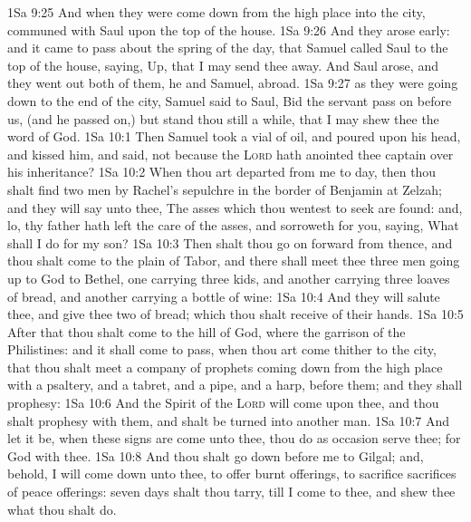 \vs 1Sa 9:25 And when they were come down from the high place into the city,  communed with Saul upon the top of the house.
\vs 1Sa 9:26 And they arose early: and it came to pass about the spring of the day, that Samuel called Saul to the top of the house, saying, Up, that I may send thee away. And Saul arose, and they went out both of them, he and Samuel, abroad.
\vs 1Sa 9:27  as they were going down to the end of the city, Samuel said to Saul, Bid the servant pass on before us, (and he passed on,) but stand thou still a while, that I may shew thee the word of God.
\vs 1Sa 10:1 Then Samuel took a vial of oil, and poured  upon his head, and kissed him, and said,  not because the \textsc{Lord} hath anointed thee  captain over his inheritance?
\vs 1Sa 10:2 When thou art departed from me to day, then thou shalt find two men by Rachel's sepulchre in the border of Benjamin at Zelzah; and they will say unto thee, The asses which thou wentest to seek are found: and, lo, thy father hath left the care of the asses, and sorroweth for you, saying, What shall I do for my son?
\vs 1Sa 10:3 Then shalt thou go on forward from thence, and thou shalt come to the plain of Tabor, and there shall meet thee three men going up to God to Bethel, one carrying three kids, and another carrying three loaves of bread, and another carrying a bottle of wine:
\vs 1Sa 10:4 And they will salute thee, and give thee two  of bread; which thou shalt receive of their hands.
\vs 1Sa 10:5 After that thou shalt come to the hill of God, where  the garrison of the Philistines: and it shall come to pass, when thou art come thither to the city, that thou shalt meet a company of prophets coming down from the high place with a psaltery, and a tabret, and a pipe, and a harp, before them; and they shall prophesy:
\vs 1Sa 10:6 And the Spirit of the \textsc{Lord} will come upon thee, and thou shalt prophesy with them, and shalt be turned into another man.
\vs 1Sa 10:7 And let it be, when these signs are come unto thee,  thou do as occasion serve thee; for God  with thee.
\vs 1Sa 10:8 And thou shalt go down before me to Gilgal; and, behold, I will come down unto thee, to offer burnt offerings,  to sacrifice sacrifices of peace offerings: seven days shalt thou tarry, till I come to thee, and shew thee what thou shalt do.
